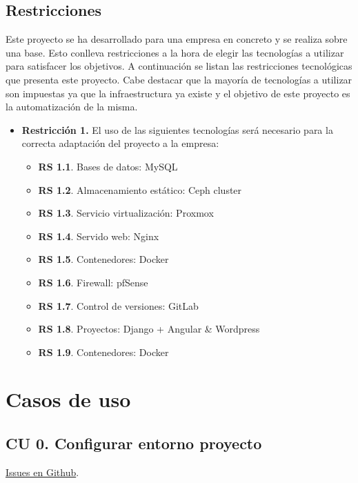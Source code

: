 	\subsection{Restricciones}
	\label{restricciones}
	\begin{text}
		Este proyecto se ha desarrollado para una empresa en concreto y se realiza sobre una base. Esto conlleva restricciones a la hora de elegir las tecnologías a utilizar para satisfacer los objetivos. A continuación se listan las restricciones tecnológicas que presenta este proyecto. Cabe destacar que la mayoría de tecnologías a utilizar son impuestas ya que la infraestructura ya existe y el objetivo de este proyecto es la automatización de la misma.
		
		\begin{itemize}
			\item \textbf{Restricción 1.} El uso de las siguientes tecnologías será necesario para la correcta adaptación del proyecto a la empresa:
			\begin{itemize}
				\item \textbf{RS 1.1}. Bases de datos: MySQL
				\item \textbf{RS 1.2}. Almacenamiento estático: Ceph cluster
				\item \textbf{RS 1.3}. Servicio virtualización: Proxmox
				\item \textbf{RS 1.4}. Servido web: Nginx
				\item \textbf{RS 1.5}. Contenedores: Docker
				\item \textbf{RS 1.6}. Firewall: pfSense
				\item \textbf{RS 1.7}. Control de versiones: GitLab
				\item \textbf{RS 1.8}. Proyectos: Django + Angular \& Wordpress
				\item \textbf{RS 1.9}. Contenedores: Docker
			\end{itemize}
		\end{itemize}
	\end{text}

\section{Casos de uso}
\label{casosdeuso}
	\subsection{CU 0. Configurar entorno proyecto}
	\href{https://github.com/VictorMorenoJimenez/tfg2020/milestone/11?closed=1}{Issues en Github}.
	
